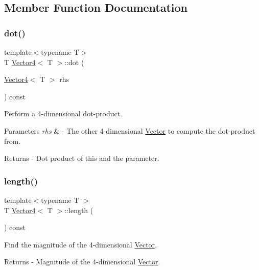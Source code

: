 \subsection{Member Function Documentation}
\mbox{\label{class_vector4_ae9d1720458cdff4084f2f20dadbc0dd7}} 
\subsubsection{\texorpdfstring{dot()}{dot()}}
{\footnotesize\ttfamily template$<$typename T$>$ \\
T \mbox{\hyperlink{class_vector4}{Vector4}}$<$ T $>$\+::dot (\begin{DoxyParamCaption}\item[{\mbox{\hyperlink{class_vector4}{Vector4}}$<$ T $>$}]{rhs }\end{DoxyParamCaption}) const}

Perform a 4-\/dimensional dot-\/product. 
\begin{DoxyParams}{Parameters}
{\em rhs} & -\/ The other 4-\/dimensional \mbox{\hyperlink{class_vector}{Vector}} to compute the dot-\/product from. \\
\hline
\end{DoxyParams}
\begin{DoxyReturn}{Returns}
-\/ Dot product of this and the parameter. 
\end{DoxyReturn}
\mbox{\label{class_vector4_a1c8ab62fe32713c21353d71a1b23b0f2}} 
\subsubsection{\texorpdfstring{length()}{length()}}
{\footnotesize\ttfamily template$<$typename T $>$ \\
T \mbox{\hyperlink{class_vector4}{Vector4}}$<$ T $>$\+::length (\begin{DoxyParamCaption}{ }\end{DoxyParamCaption}) const}

Find the magnitude of the 4-\/dimensional \mbox{\hyperlink{class_vector}{Vector}}. \begin{DoxyReturn}{Returns}
-\/ Magnitude of the 4-\/dimensional \mbox{\hyperlink{class_vector}{Vector}}. 
\end{DoxyReturn}
\mbox{\label{class_vector4_ab03ee378cc4b82bcb2429ca4fe7fe53b}} 
